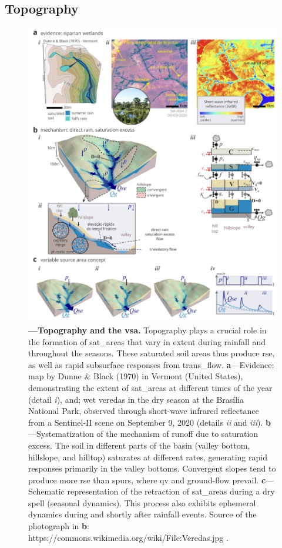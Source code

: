 \documentclass[./main_en.tex]{subfiles}
\begin{document}
\subsection{Topography}

\begin{figure}[t!] 
\centering				
\includegraphics[width=0.98\linewidth]{figs/fig_topo_en.jpg}		
\caption[Topography and variable contributing area]
{\textbf{---\;Topography and the \gls{vsa}.}
    Topography plays a crucial role in the formation of \gls{sat_areas} that vary in extent during rainfall and throughout the seasons. These saturated soil areas thus produce \gls{rse}, as well as rapid subsurface responses from \gls{trans_flow}.
    \;\textbf{a}\;---\;Evidence: map by Dunne \& Black (1970) in Vermont (United States), demonstrating the extent of \gls{sat_areas} at different times of the year (detail \textrm{\textit{i}}), and; wet veredas in the dry season at the Brasília National Park, observed through short-wave infrared reflectance from a Sentinel-II scene on September 9, 2020 (details \textrm{\textit{ii}} and \textrm{\textit{iii}}).
    \;\textbf{b}\;---\;Systematization of the mechanism of runoff due to saturation excess. The soil in different parts of the basin (valley bottom, hillslope, and hilltop) saturates at different rates, generating rapid responses primarily in the valley bottoms. Convergent slopes tend to produce more \gls{rse} than \gls{spurs}, where \gls{qv} and \gls{ground-flow} prevail.
    \;\textbf{c}\;---\;Schematic representation of the retraction of \gls{sat_areas} during a dry spell (seasonal dynamics). This process also exhibits ephemeral dynamics during and shortly after rainfall events. Source of the photograph in \textbf{b}: https://commons.wikimedia.org/wiki/File:Veredas.jpg .
}
\label{fig:hydro:topo} 		
\end{figure}
\end{document}
